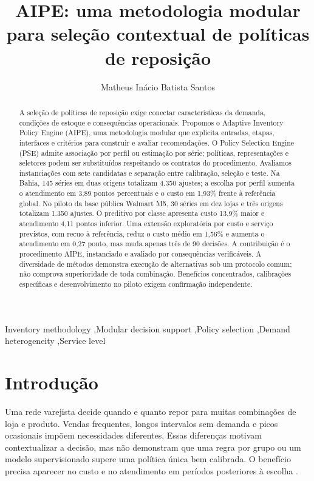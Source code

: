 \documentclass[preprint,12pt]{elsarticle}
\begin{document}
\begin{frontmatter}
\title{AIPE: uma metodologia modular para seleção contextual de políticas de reposição}
\author[ufal]{Matheus Inácio Batista Santos}
\begin{abstract}
A seleção de políticas de reposição exige conectar características da demanda, condições de estoque e consequências operacionais. Propomos o Adaptive Inventory Policy Engine (AIPE), uma metodologia modular que explicita entradas, etapas, interfaces e critérios para construir e avaliar recomendações. O Policy Selection Engine (PSE) admite associação por perfil ou estimação por série; políticas, representações e seletores podem ser substituídos respeitando os contratos do procedimento. Avaliamos instanciações com sete candidatas e separação entre calibração, seleção e teste. Na Bahia, 145 séries em duas origens totalizam 4.350 ajustes; a escolha por perfil aumenta o atendimento em 3,89 pontos percentuais e o custo em 1,93\% frente à referência global. No piloto da base pública Walmart M5, 30 séries em dez lojas e três origens totalizam 1.350 ajustes. O preditivo por classe apresenta custo 13,9\% maior e atendimento 4,11 pontos inferior. Uma extensão exploratória por custo e serviço previstos, com recuo à referência, reduz o custo médio em 1,56\% e aumenta o atendimento em 0,27 ponto, mas muda apenas três de 90 decisões. A contribuição é o procedimento AIPE, instanciado e avaliado por consequências verificáveis. A diversidade de métodos demonstra execução de alternativas sob um protocolo comum; não comprova superioridade de toda combinação. Benefícios concentrados, calibrações específicas e desenvolvimento no piloto exigem confirmação independente.
\end{abstract}
\begin{keyword}
Inventory methodology \sep Modular decision support \sep Policy selection \sep Demand heterogeneity \sep Service level
\end{keyword}
\end{frontmatter}

\section{Introdução}
Uma rede varejista decide quando e quanto repor para muitas combinações de loja e produto. Vendas frequentes, longos intervalos sem demanda e picos ocasionais impõem necessidades diferentes. Essas diferenças motivam contextualizar a decisão, mas não demonstram que uma regra por grupo ou um modelo supervisionado supere uma política única bem calibrada. O benefício precisa aparecer no custo e no atendimento em períodos posteriores à escolha \cite{Axsater2006InventoryControl}.
\end{document}
